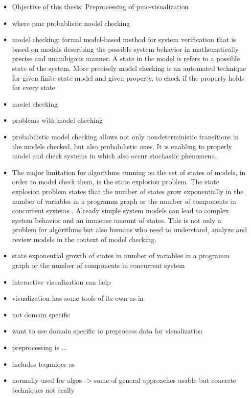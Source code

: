 \documentclass[preview]{standalone}
\begin{document}
		\begin{itemize}
			\item Objective of this thesis: Preprocessing of pmc-visualization
			\item where pmc probablistic model checking
			\item model checking: formal model-based method for system verification that is based on models describing the possible system behavior in mathematically precise and unambigous manner. A state in the model is refers to a possible state of the system. More precisely model checking is an automated technique for given finite-state model and given property, to check if the property holds for every state  \cite[chs. 1.1 and 1.2]{Baier2008}
			\item model checking
			\item problems with model checking
			\item probabilistic model checking allows not only nondeterministic transitions in the models checked, but also probabilistic ones. It is enabling to properly model and check systems in which also occur stochastic phenomena. 
			\item The major limitation for algorithms running on the set of states of models, in order to model check them, is the state explosion problem. The state explosion problem states that the number of states grow exponentially in the number of variables in a programm graph or the number of components in concurrent systems \cite[ch. 2.3]{Baier2008}. Already simple system models can lead to complex system behavior and an immense amount of states. This is not only a problem for algorithms but also humans who need to understand, analyze and review models in the context of model checking.
			\item state exponential growth of states in number of variables in a programm graph or the number of components in concurrent system \cite[ch. 2.3]{Baier2008}
			\item interactive visualization can help
			\item visualization has some tools of its own as in 
			\item not domain specific 
			\item want to use domain specific to preprocess data for visualization
			\item preprocessing is ... 
			\item includes teqnuiqes as
			\item normally used for algos -> some of general approaches usable but concrete techniques not really

\end{itemize}
\end{document}

